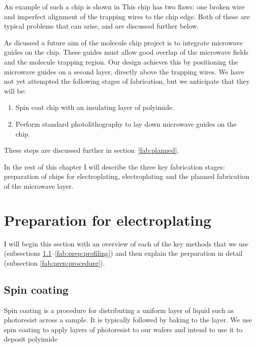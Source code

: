 An example of such a chip is shown in  This chip has two flaws: one broken wire
 and imperfect alignment of the trapping wires
to the chip edge. Both of these are typical problems that can arise, and are
discussed further below.

As dicussed  a future aim of the molecule chip project is to
integrate microwave guides on the chip. These guides must allow good overlap of
the microwave fields and the molecule trapping region. Our design achieves this
by positioning the microwave guides on a second layer, directly above the
trapping wires.  We have not yet attempted the following stages of
fabrication, but we anticipate that they will be:
\begin{enumerate}[resume]
    \item Spin coat chip with an insulating layer of polyimide.
    \item Perform standard photolithography to lay down microwave guides on the
      chip.
\end{enumerate}
These steps are discussed further in section~\ref{fab:planned}.

In the rest of this chapter I will describe the three key fabrication stages:
preparation of chips for electroplating, electroplating and the planned
fabrication of the microwave layer.

\section{Preparation for electroplating}
\label{fab:prep}

I will begin this section with an overview of each of the key methods that we
use (subsections \ref{fab:prep:spincoat}--\ref{fab:prep:profiling}) and then
explain the perparation in detail (subsection \ref{fab:prep:procedure}).

\subsection{Spin coating}
\label{fab:prep:spincoat}

Spin coating is a procedure for distributing a uniform layer of liquid such as
photoresist  across a sample. It is typically followed by baking to
 the layer. We use spin coating to apply layers of photoresist to
our wafers and intend to use it to deposit polyimide

